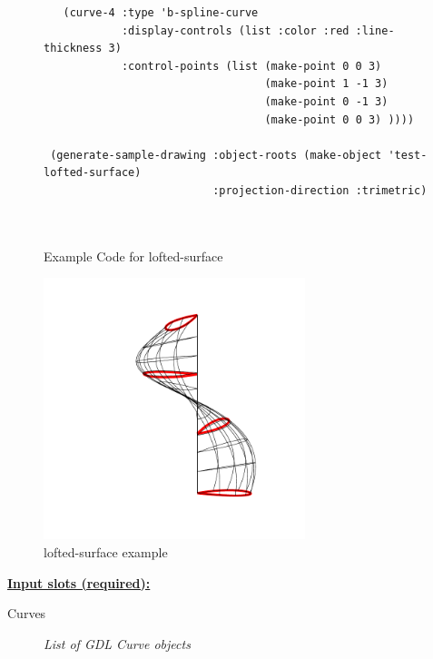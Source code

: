 \documentclass [11pt]{book}
\begin{document}
\begin{itemize}
\begin{figure}
\begin{lrbox}{\boxedverb}
\begin{minipage}{\linewidth}
{\begin{verbatim}
   (curve-4 :type 'b-spline-curve
            :display-controls (list :color :red :line-thickness 3)
            :control-points (list (make-point 0 0 3)
                                  (make-point 1 -1 3)
                                  (make-point 0 -1 3)
                                  (make-point 0 0 3) ))))

 (generate-sample-drawing :object-roots (make-object 'test-lofted-surface)
                          :projection-direction :trimetric)

 
\end{verbatim}}
\end{minipage}
\end{lrbox}
\fbox{\usebox{\boxedverb}}

\caption{Example Code for lofted-surface}

\label{fig:example-code-lofted-surface}

\end{figure}

\begin{figure}
\begin{center}
\includegraphics[width=3in,height=3in]{../images/example-lofted-surface.pdf}
\end{center}

\caption{lofted-surface example}

\label{fig:lofted-surface}

\end{figure}





\textbf{
\underline{Input slots (required):}}

\begin{description}

\item [Curves]
\emph{List of GDL Curve objects}


\end{description}
\end{itemize}
\end{document}

